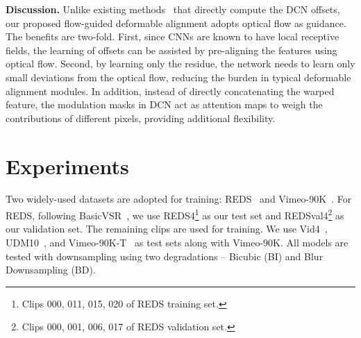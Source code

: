 \documentclass[10pt,twocolumn,letterpaper]{article}
\begin{document}
\noindent\textbf{Discussion.} Unlike existing methods~\cite{tian2020tdan,wang2019deformable,wang2019edvr,xu2020learning} that directly compute the DCN offsets, our proposed flow-guided deformable alignment adopts optical flow as guidance. The benefits are two-fold. First, since CNNs are known to have local receptive fields, the learning of offsets can be assisted by pre-aligning the features using optical flow.
Second, by learning only the residue, the network needs to learn only small deviations from the optical flow, reducing the burden in typical deformable alignment modules.
In addition, instead of directly concatenating the warped feature, the modulation masks in DCN act as attention maps to weigh the contributions of different pixels, providing additional flexibility. \begin{table}[!t]
    \caption{\textbf{Performance of a lighter BasicVSR++.} Our lighter model, BasicVSR++ (S), has a similar complexity to BasicVSR and IconVSR, but still shows considerable improvements. The PSNR and runtime are computed on REDS4.}
    \vspace{-0.4cm}
    \label{tab:small_model}
    \begin{center}
        \tabcolsep=0.13cm
    \end{center}
    \vspace{-0.5cm}
\end{table}


\section{Experiments}
\label{sec:exp}
Two widely-used datasets are adopted for training: REDS~\cite{nah2019ntire} and Vimeo-90K~\cite{xue2019video}.
For REDS, following BasicVSR~\cite{chan2021basicvsr}, we use REDS4\footnote{Clips 000, 011, 015, 020 of REDS training set.} as our test set and REDSval4\footnote{Clips 000, 001, 006, 017 of REDS validation set.} as our validation set. The remaining clips are used for training.
We use Vid4~\cite{liu2014bayesian}, UDM10~\cite{yi2019progressive}, and Vimeo-90K-T~\cite{xue2019video} as test sets along with Vimeo-90K.
All models are tested with  downsampling using two degradations -- Bicubic (BI) and Blur Downsampling (BD).
\end{document}
